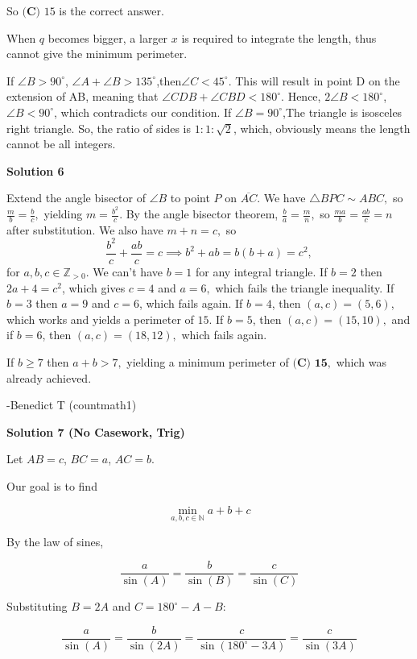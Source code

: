 \begin{enumerate}
 So $\boxed{\textbf{(C) }15}$ is the correct answer.

 When $q$ becomes bigger, a larger $x$ is required to integrate the length, thus cannot give the minimum perimeter.

 If $\angle B>90^\circ$, $\angle A+\angle B>135^\circ$,then$\angle C<45^\circ$. This will result in point D on the extension of AB, meaning that $\angle CDB+\angle CBD<180^\circ$. Hence, $2\angle B<180^\circ$,$\angle B<90^\circ$, which contradicts our condition. If $\angle B=90^\circ$,The triangle is isosceles right triangle. So, the ratio of sides is $1:1:\sqrt{2}$, which, obviously means the length cannot be all integers. 

 



\textbf{Solution 6}

Extend the angle bisector of $\angle B$ to point $P$ on $\overline{AC}.$ We have $\triangle BPC \sim ABC,$ so $\frac{m}{b} = \frac{b}{c},$ yielding $m = \frac{b^2}{c}.$ By the angle bisector theorem, $\frac{b}{a} = \frac{m}{n},$ so $\frac{ma}{b} = \frac{ab}{c} = n$ after substitution. We also have $m + n = c,$ so 
 \[\frac{b^2}{c} + \frac{ab}{c} = c \implies b^2 + ab = b(b + a) = c^2,\]for $a, b, c \in \mathbb{Z}_{> 0}.$ We can't have $b=1$ for any integral triangle. If $b = 2$ then $2a + 4 = c^2$, which gives $c = 4$ and $a = 6,$ which fails the triangle inequality. If $b=3$ then $a = 9$ and $c = 6$, which fails again. If $b = 4$, then $(a, c) = (5, 6)$, which works and yields a perimeter of $15$. If $b=5$, then $(a, c) = (15, 10),$ and if $b = 6$, then $(a, c) = (18, 12),$ which fails again.

 If $b \geq 7$ then $a+b>7,$ yielding a minimum perimeter of $\boxed{\textbf{(C)\ 15}},$ which was already achieved.

 -Benedict T (countmath1)

 



\textbf{Solution 7 (No Casework, Trig)}

Let $AB=c$, $BC=a$, $AC=b$. 

 Our goal is to find

 
 \[\min_{a,b,c \in \mathbb{N}} a+b+c\]

 By the law of sines,

 
 \[\frac{a}{\sin(A)} = \frac{b}{\sin(B)} = \frac{c}{\sin(C)}\]

 Substituting $B=2A$ and $C = 180^\circ - A - B$:

 
 \[\frac{a}{\sin(A)} = \frac{b}{\sin(2A)} = \frac{c}{\sin(180^\circ-3A)} = \frac{c}{\sin(3A)}\]


\end{enumerate}
